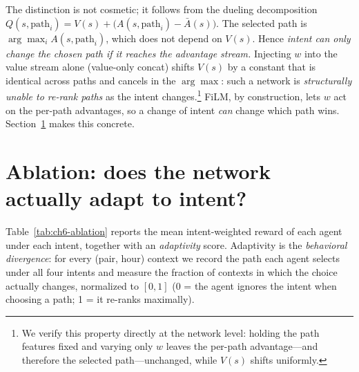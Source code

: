 The distinction is not cosmetic; it follows from the dueling decomposition
$Q(s,\text{path}_i) = V(s) + \big(A(s,\text{path}_i) - \bar{A}(s)\big)$. The
selected path is $\arg\max_i A(s,\text{path}_i)$, which does not depend on
$V(s)$. Hence \emph{intent can only change the chosen path if it reaches the
advantage stream.} Injecting $w$ into the value stream alone (value-only concat)
shifts $V(s)$ by a constant that is identical across paths and cancels in the
$\arg\max$: such a network is \emph{structurally unable to re-rank paths} as the
intent changes.\footnote{We verify this property directly at the network level:
holding the path features fixed and varying only $w$ leaves the per-path
advantage---and therefore the selected path---unchanged, while $V(s)$ shifts
uniformly.} FiLM, by construction, lets $w$ act on the per-path advantages, so a
change of intent \emph{can} change which path wins.
Section~\ref{sec:ch6-ablation} makes this concrete.

\section{Ablation: does the network actually adapt to intent?}
\label{sec:ch6-ablation}

Table~\ref{tab:ch6-ablation} reports the mean intent-weighted reward of each
agent under each intent, together with an \emph{adaptivity} score. Adaptivity is
the \emph{behavioral divergence}: for every (pair, hour) context we record the
path each agent selects under all four intents and measure the fraction of
contexts in which the choice actually changes, normalized to $[0,1]$ (0 = the
agent ignores the intent when choosing a path; 1 = it re-ranks maximally).

\begin{table}[t]
  \centering
  \caption{Mean intent-weighted reward by agent and intent on the held-out
  window, with the behavioral-divergence (adaptivity) score. Conditioning lifts
  reward far above the non-conditioned Flat DQN under every intent. Flat DQN and
  the value-only concat leave their path ranking essentially unchanged across
  intents (adaptivity $\approx 0$), whereas FiLM---which routes the intent into
  the per-path advantage stream---re-ranks paths as the intent vector changes.}
  \label{tab:ch6-ablation}
  
\end{table}

